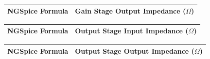 \begin{table}[H] \centering
  \begin{tabular}{|l|r|}
    \hline    
    {\bf NGSpice Formula} & {\bf Gain Stage Output Impedance ($\Omega$)}\\ \hline
    
  \end{tabular}
 \label{tab:outimp}
\end{table}

\begin{table}[H] \centering
  \begin{tabular}{|l|r|}
    \hline    
    {\bf NGSpice Formula} & {\bf Output Stage Input Impedance ($\Omega$)}\\ \hline
    
  \end{tabular}
 \label{tab:inputimp2}
\end{table}

\begin{table}[H] \centering
  \begin{tabular}{|l|r|}
    \hline    
    {\bf NGSpice Formula} & {\bf Output Stage Output Impedance ($\Omega$)}\\ \hline
    
  \end{tabular}
 \label{tab:outimp2}
\end{table}


\pagebreak
